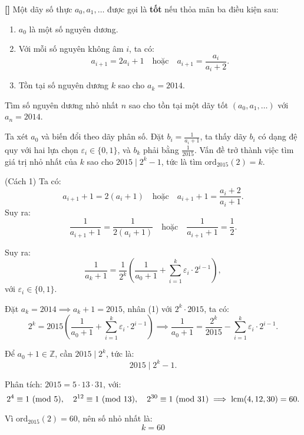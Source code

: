 \documentclass[../05-modular-arithmetic-a.tex]{subfiles}
\begin{document}
\begin{example*}\label{example:APMO-2015-MO-P3}\textbf{[]}
	Một dãy số thực \( a_0, a_1, \ldots \) được gọi là \textbf{tốt} nếu thỏa mãn ba điều kiện sau:
	\begin{enumerate}[topsep=0pt, partopsep=0pt, itemsep=0pt, label=(\roman*)]
		\item \( a_0 \) là một số nguyên dương.
		\item Với mỗi số nguyên không âm \( i \), ta có:
		\[
			a_{i+1} = 2a_i + 1 \quad \text{hoặc} \quad a_{i+1} = \frac{a_i}{a_i + 2}.
		\]
		\item Tồn tại số nguyên dương \( k \) sao cho \( a_k = 2014 \).
	\end{enumerate}
	
	Tìm số nguyên dương nhỏ nhất \( n \) sao cho tồn tại một dãy tốt \( (a_0, a_1, \ldots) \) với \( a_n = 2014 \).	
\end{example*}

\begin{story*}
    Ta xét \( a_0 \) và biến đổi theo dãy phân số. Đặt \( b_i = \frac{1}{a_i + 1} \), ta thấy dãy \( b_i \) có dạng đệ quy với hai lựa chọn \( \varepsilon_i \in \{0, 1\} \), và \( b_k \) phải bằng \( \frac{1}{2015} \).  
    Vấn đề trở thành việc tìm giá trị nhỏ nhất của \( k \) sao cho \( 2015 \mid 2^k - 1 \), tức là tìm \( \text{ord}_{2015}(2) = k \).
\end{story*}

\bigbreak

\begin{soln}(Cách 1)\footnotemark
	Ta có:
	\[
		a_{i+1} + 1 = 2(a_i + 1) \quad \text{hoặc} \quad a_{i+1} + 1 = \frac{a_i + 2}{a_i + 1}.
	\]
	Suy ra:
	\[
		\frac{1}{a_{i+1} + 1} = \frac{1}{2(a_i + 1)} \quad \text{hoặc} \quad \frac{1}{a_{i+1} + 1} = \frac{1}{2}.
	\]

	Suy ra:
	\[
		\frac{1}{a_k + 1} = \frac{1}{2^k} \left( \frac{1}{a_0 + 1} + \sum_{i = 1}^{k} \varepsilon_i \cdot 2^{i - 1} \right), \tag{1}
	\]
	với \( \varepsilon_i \in \{0, 1\} \).

	Đặt \( a_k = 2014 \implies a_k + 1 = 2015 \), nhân (1) với \( 2^k \cdot 2015 \), ta có:
	\[
		2^k = 2015 \left( \frac{1}{a_0 + 1} + \sum_{i = 1}^{k} \varepsilon_i \cdot 2^{i - 1} \right)
	\implies \frac{1}{a_0 + 1} = \frac{2^k}{2015} - \sum_{i = 1}^{k} \varepsilon_i \cdot 2^{i - 1}.
	\]

	Để \( a_0 + 1 \in \mathbb{Z} \), cần \( 2015 \mid 2^k \), tức là:
	\[
		2015 \mid 2^k - 1.
	\]

	Phân tích: \( 2015 = 5 \cdot 13 \cdot 31 \), với:
	\[
		2^4 \equiv 1 \ (\mathrm{mod}\ 5),\quad 2^{12} \equiv 1 \ (\mathrm{mod}\ 13),\quad 2^{30} \equiv 1 \ (\mathrm{mod}\ 31)
	\implies \text{lcm}(4, 12, 30) = 60.
	\]

	Vì \( \text{ord}_{2015}(2) = 60 \), nên số nhỏ nhất là:
	\[
		\boxed{k = 60}
	\]
\end{soln}
\end{document}
